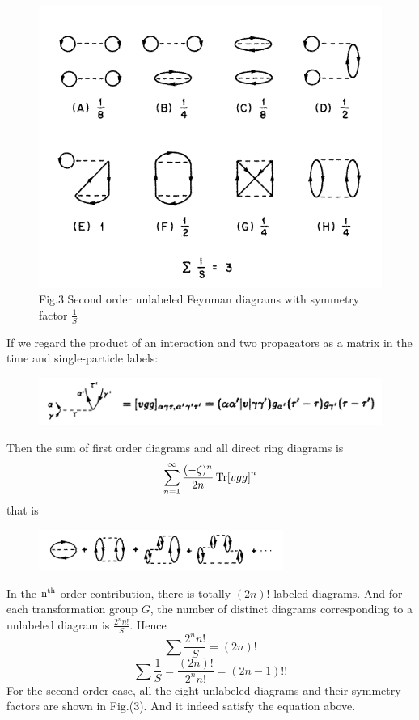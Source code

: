 \documentclass[12pt]{article}
\begin{document}
\begin{figure}[H]
    \centering
    \includegraphics[width=13cm]{p4.png}
    \caption*{Fig.3  Second order unlabeled Feynman diagrams with symmetry factor 
    $\frac{1}{S}$}
    \label{}
\end{figure} 
If we regard the product of an interaction and two propagators as a matrix in the 
time and single-particle labels:
\begin{figure}[H]
    \centering
    \includegraphics[width=15cm]{p5.png}
    \caption*{}
    \label{}
\end{figure}
Then the sum of first order diagrams and all direct ring diagrams is 
\begin{equation*}
    \sum_{n=1}^\infty\frac{(-\zeta)^n}{2n}\Tr[vgg]^n
\end{equation*}
that is 
\begin{figure}[H]
    \centering
    \includegraphics[width=8cm]{p6.png}
    \caption*{}
    \label{}
\end{figure}
In the $\rm n^{th}$ order contribution, there is totally $(2n)!$ labeled diagrams. And for 
each transformation group $G$, the number of distinct diagrams corresponding to a 
unlabeled diagram is $\frac{2^nn!}{S}$. Hence
\begin{equation*}
    \sum\frac{2^nn!}{S}=(2n)!
\end{equation*} 
\begin{equation*}
    \sum\frac{1}{S}=\frac{(2n)!}{2^nn!}=(2n-1)!!
\end{equation*} 
For the second order case, all the eight unlabeled diagrams and their symmetry 
factors are shown in Fig.(3). And it indeed satisfy the equation above.
\end{document}
